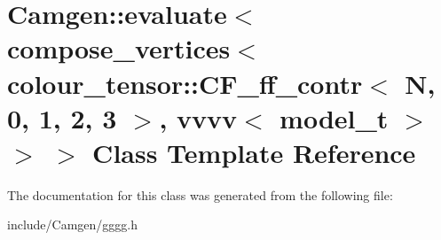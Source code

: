 \hypertarget{a00158}{\section{Camgen\-:\-:evaluate$<$ compose\-\_\-vertices$<$ colour\-\_\-tensor\-:\-:C\-F\-\_\-ff\-\_\-contr$<$ N, 0, 1, 2, 3 $>$, vvvv$<$ model\-\_\-t $>$ $>$ $>$ Class Template Reference}
\label{a00158}
}


The documentation for this class was generated from the following file\-:\begin{DoxyCompactItemize}
\item 
include/\-Camgen/gggg.\-h\end{DoxyCompactItemize}
